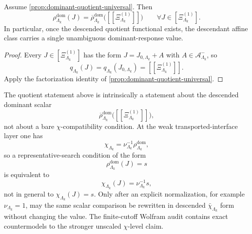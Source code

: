 \documentclass[11pt]{article}
\begin{document}
\begin{corollary}
\label{cor:dominant-quotient-constancy}
Assume \cref{prop:dominant-quotient-universal}. Then
\[
\rho^{\mathrm{dom}}_{\Lambda_k}(J)
=
\overline{\rho}^{\mathrm{dom}}_{\Lambda_k}\big([\![\Xi^{(1)}_{\Lambda_k}]\!]\big)
\qquad
\forall J\in[\Xi^{(1)}_{\Lambda_k}].
\]
In particular, once the descended quotient functional exists, the descendant affine class carries a
single unambiguous dominant-response value.
\end{corollary}

\begin{proof}
Every \(J\in[\Xi^{(1)}_{\Lambda_k}]\) has the form
\(
J=J_{0,\Lambda_k}+A
\)
with \(A\in\mathcal A^-_{\Lambda_k}\), so
\[
q_{\Lambda_k}(J)=q_{\Lambda_k}(J_{0,\Lambda_k})=[\![\Xi^{(1)}_{\Lambda_k}]\!].
\]
Apply the factorization identity of \cref{prop:dominant-quotient-universal}.
\end{proof}

\begin{remark}
\label{rem:dominant-quotient-false-stronger-form}
The quotient statement above is intrinsically a statement about the descended dominant scalar
\[
\overline{\rho}^{\mathrm{dom}}_{\Lambda_k}\big([\![\Xi^{(1)}_{\Lambda_k}]\!]\big),
\]
not about a bare \(\chi\)-compatibility condition.
At the weak transported-interface layer one has
\[
\chi_{\Lambda_k}
=
\nu_{\Lambda_k}^{-1}\rho^{\mathrm{dom}}_{\Lambda_k},
\]
so a representative-search condition of the form
\[
\rho^{\mathrm{dom}}_{\Lambda_k}(J)=s
\]
is equivalent to
\[
\chi_{\Lambda_k}(J)=\nu_{\Lambda_k}^{-1}s,
\]
not in general to \(\chi_{\Lambda_k}(J)=s\).
Only after an explicit normalization, for example \(\nu_{\Lambda_k}=1\), may the same scalar
comparison be rewritten in descended \(\bar\chi_{\Lambda_k}\) form without changing the value.
The finite-cutoff Wolfram audit contains exact countermodels to the stronger unscaled
\(\chi\)-level claim.
\end{remark}
\end{document}
